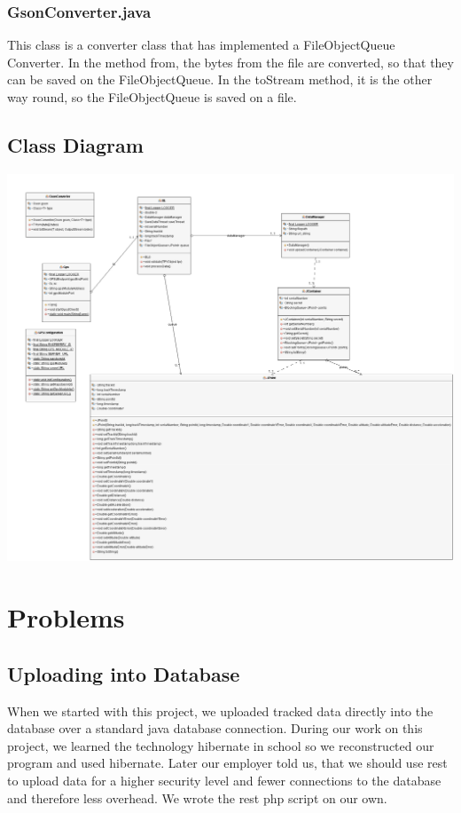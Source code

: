 \subsubsection{GsonConverter.java}
This class is a converter class that has implemented a FileObjectQueue Converter. In the method from, the bytes from the file are converted, so that they can be saved on the FileObjectQueue. In the toStream method, it is the other way round, so the FileObjectQueue is saved on a file.
\subsection{Class Diagram}
\begin{center}
\includegraphics[width=1\textwidth]{GPS_REST_UML_Diagram}
\end{center}
\section{Problems}
\subsection{Uploading into Database}
When we started with this project, we uploaded tracked data directly into the database over a standard java database connection. During our work on this project, we learned the technology hibernate in school so we reconstructed our program and used hibernate. Later our employer told us, that we should use \gls{rest} to upload data for a higher security level and fewer connections to the database and therefore less overhead. We wrote the \gls{rest} \gls{php} script on our own. 
